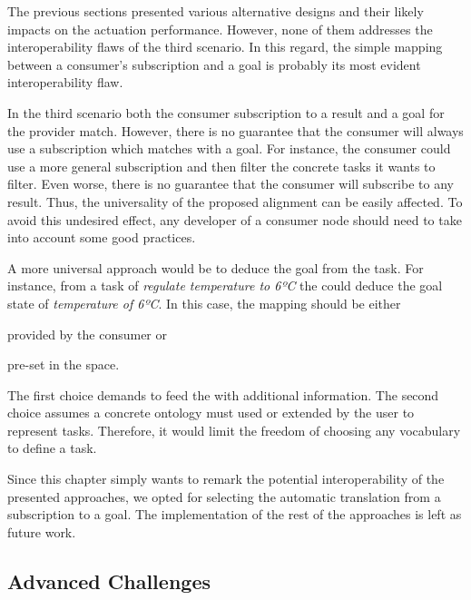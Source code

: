 The previous sections presented various alternative designs and their likely impacts on the actuation performance.
However, none of them addresses the interoperability flaws of the third scenario.
In this regard, the simple mapping between a consumer's subscription and a goal is probably its most evident interoperability flaw.


In the third scenario both the consumer subscription to a result and a goal for the provider match.
However, there is no guarantee that the consumer will always use a subscription which matches with a goal.
For instance, the consumer could use a more general subscription and then filter the concrete tasks it wants to filter.
Even worse, there is no guarantee that the consumer will subscribe to any result.
Thus, the universality of the proposed alignment can be easily affected.
To avoid this undesired effect, any developer of a consumer node should need to take into account some good practices. %


A more universal approach would be to deduce the goal from the task. %
For instance, from a task of \emph{regulate temperature to 6ºC} the \Space{} could deduce the goal state of \emph{temperature of 6ºC}.
In this case, the mapping should be either
\begin{enumerate*}[label=\itshape(\arabic*\upshape)]
  \item provided by the consumer or
  \item pre-set in the space.
\end{enumerate*}
The first choice demands to feed the \Space{} with additional information. %
The second choice assumes a concrete ontology must used or extended by the user to represent tasks.
Therefore, it would limit the freedom of choosing any vocabulary to define a task.


Since this chapter simply wants to remark the potential interoperability of the presented approaches,
we opted for selecting the automatic translation from a subscription to a goal.
The implementation of the rest of the approaches is left as future work.



\subsection{Advanced Challenges} %

